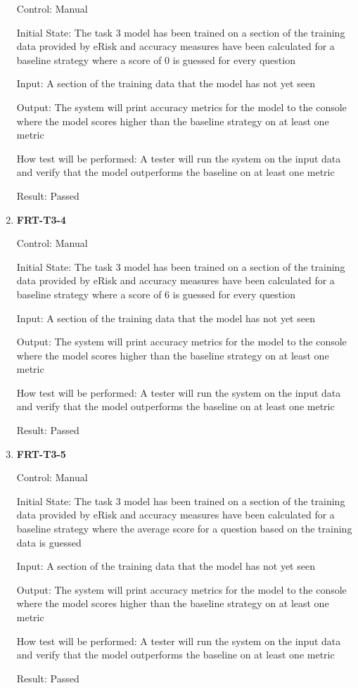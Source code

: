 \documentclass[12pt, titlepage]{article}
\begin{document}
\begin{enumerate}
Control: Manual

Initial State: The task 3 model has been trained on a section of the training data provided by eRisk and accuracy measures have been calculated for a baseline strategy where a score of 0 is guessed for every question

Input: A section of the training data that the model has not yet seen

Output: The system will print accuracy metrics for the model to the console where the model scores higher than the baseline strategy on at least one metric

How test will be performed: A tester will run the system on the input data and verify that the model outperforms the baseline on at least one metric

Result: Passed

\item \textbf{FRT-T3-4}

Control: Manual

Initial State: The task 3 model has been trained on a section of the training data provided by eRisk and accuracy measures have been calculated for a baseline strategy where a score of 6 is guessed for every question

Input: A section of the training data that the model has not yet seen

Output: The system will print accuracy metrics for the model to the console where the model scores higher than the baseline strategy on at least one metric

How test will be performed: A tester will run the system on the input data and verify that the model outperforms the baseline on at least one metric

Result: Passed

\item \textbf{FRT-T3-5}

Control: Manual

Initial State: The task 3 model has been trained on a section of the training data provided by eRisk and accuracy measures have been calculated for a baseline strategy where the average score for a question based on the training data is guessed

Input: A section of the training data that the model has not yet seen

Output: The system will print accuracy metrics for the model to the console where the model scores higher than the baseline strategy on at least one metric

How test will be performed: A tester will run the system on the input data and verify that the model outperforms the baseline on at least one metric

Result: Passed

 \end{enumerate}
\end{document}
